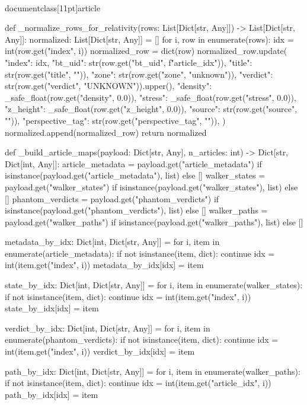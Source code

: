 \\documentclass[11pt]{article}
\begin{document}
\begin{CodeBlock}
def _normalize_rows_for_relativity(rows: List[Dict[str, Any]]) -> List[Dict[str, Any]]:
    normalized: List[Dict[str, Any]] = []
    for i, row in enumerate(rows):
        idx = int(row.get("index", i))
        normalized_row = dict(row)
        normalized_row.update(
            {
                "index": idx,
                "bt_uid": str(row.get("bt_uid", f"article_{idx}")),
                "title": str(row.get("title", "")),
                "zone": str(row.get("zone", "unknown")),
                "verdict": str(row.get("verdict", "UNKNOWN")).upper(),
                "density": _safe_float(row.get("density", 0.0)),
                "stress": _safe_float(row.get("stress", 0.0)),
                "z_height": _safe_float(row.get("z_height", 0.0)),
                "source": str(row.get("source", "")),
                "perspective_tag": str(row.get("perspective_tag", "")),
            }
        )
        normalized.append(normalized_row)
    return normalized


def _build_article_maps(payload: Dict[str, Any], n_articles: int) -> Dict[str, Dict[int, Any]]:
    article_metadata = payload.get("article_metadata") if isinstance(payload.get("article_metadata"), list) else []
    walker_states = payload.get("walker_states") if isinstance(payload.get("walker_states"), list) else []
    phantom_verdicts = payload.get("phantom_verdicts") if isinstance(payload.get("phantom_verdicts"), list) else []
    walker_paths = payload.get("walker_paths") if isinstance(payload.get("walker_paths"), list) else []

    metadata_by_idx: Dict[int, Dict[str, Any]] = {}
    for i, item in enumerate(article_metadata):
        if not isinstance(item, dict):
            continue
        idx = int(item.get("index", i))
        metadata_by_idx[idx] = item

    state_by_idx: Dict[int, Dict[str, Any]] = {}
    for i, item in enumerate(walker_states):
        if not isinstance(item, dict):
            continue
        idx = int(item.get("index", i))
        state_by_idx[idx] = item

    verdict_by_idx: Dict[int, Dict[str, Any]] = {}
    for i, item in enumerate(phantom_verdicts):
        if not isinstance(item, dict):
            continue
        idx = int(item.get("index", i))
        verdict_by_idx[idx] = item

    path_by_idx: Dict[int, Dict[str, Any]] = {}
    for i, item in enumerate(walker_paths):
        if not isinstance(item, dict):
            continue
        idx = int(item.get("article_idx", i))
        path_by_idx[idx] = item


\end{CodeBlock}
\end{document}
